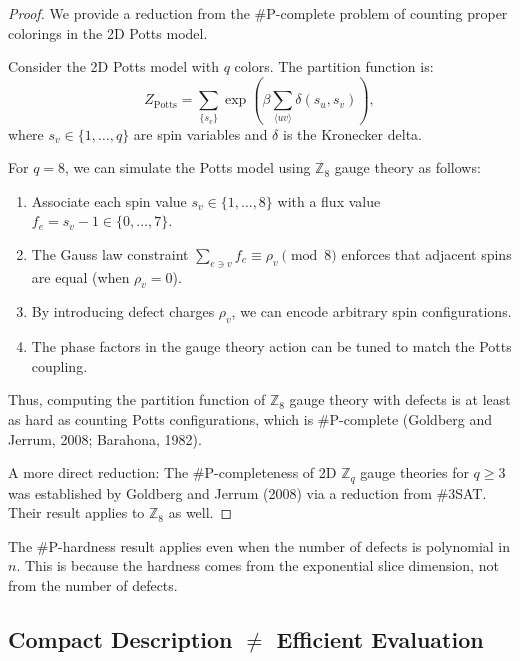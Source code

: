 \begin{proof}
We provide a reduction from the \#P-complete problem of counting proper colorings in the 2D Potts model.

Consider the 2D Potts model with $q$ colors. The partition function is:
\begin{equation}
Z_{\text{Potts}} = \sum_{\{s_v\}} \exp\left(\beta \sum_{\langle uv \rangle} \delta(s_u, s_v)\right),
\end{equation}
where $s_v \in \{1,\dots,q\}$ are spin variables and $\delta$ is the Kronecker delta.

For $q=8$, we can simulate the Potts model using $\mathbb{Z}_8$ gauge theory as follows:
\begin{enumerate}
    \item Associate each spin value $s_v \in \{1,\dots,8\}$ with a flux value $f_e = s_v - 1 \in \{0,\dots,7\}$.
    \item The Gauss law constraint $\sum_{e \ni v} f_e \equiv \rho_v \pmod{8}$ enforces that adjacent spins are equal (when $\rho_v = 0$).
    \item By introducing defect charges $\rho_v$, we can encode arbitrary spin configurations.
    \item The phase factors in the gauge theory action can be tuned to match the Potts coupling.
\end{enumerate}

Thus, computing the partition function of $\mathbb{Z}_8$ gauge theory with defects is at least as hard as counting Potts configurations, which is \#P-complete (Goldberg and Jerrum, 2008; Barahona, 1982).

A more direct reduction: The \#P-completeness of 2D $\mathbb{Z}_q$ gauge theories for $q \geq 3$ was established by Goldberg and Jerrum (2008) via a reduction from \#3SAT. Their result applies to $\mathbb{Z}_8$ as well.
\end{proof}

\begin{remark}
The \#P-hardness result applies even when the number of defects is polynomial in $n$. This is because the hardness comes from the exponential slice dimension, not from the number of defects.
\end{remark}

\subsection{Compact Description $\neq$ Efficient Evaluation}

